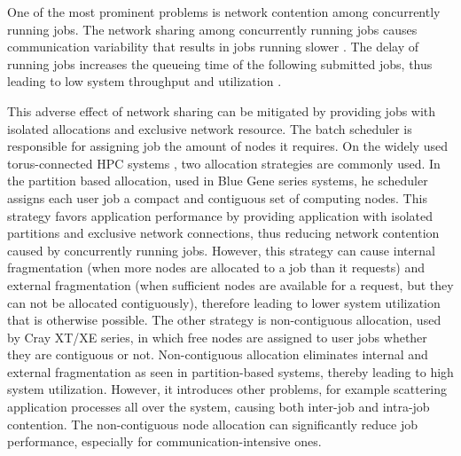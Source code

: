 \documentclass[conference]{IEEEtran}
\begin{document}

One of the most prominent  problems is network contention among concurrently running jobs. The network sharing among concurrently running jobs causes communication variability that results in jobs running slower \cite{abhinav-sc13}. The delay of running jobs increases the queueing time of the following submitted jobs, thus leading to low system throughput and utilization \cite{jose-ipdps15}. 

This adverse effect of network sharing can be mitigated by providing jobs with isolated allocations and exclusive network resource. The batch scheduler is responsible for assigning job the amount of nodes it requires. On the widely used torus-connected HPC systems \cite{bgq}\cite{tofu}\cite{titan}, two allocation strategies are commonly used. In the partition based allocation, used in Blue Gene series systems, he scheduler assigns each user job a compact and contiguous set of computing nodes. This strategy favors application performance by providing application with isolated partitions and exclusive network connections, thus reducing network contention caused by concurrently running jobs. However, this strategy can cause internal fragmentation (when more nodes are allocated to a job than it requests) and external fragmentation (when sufficient nodes are available for a request, but they can not be allocated contiguously), therefore leading to lower system utilization that is otherwise possible. The other strategy is non-contiguous allocation, used by Cray XT/XE series, in which free nodes are assigned to user jobs whether they are contiguous or not. Non-contiguous allocation eliminates internal and external fragmentation as seen in partition-based systems, thereby leading to high system utilization. However, it introduces other problems, for example scattering application processes all over the system, causing both inter-job and intra-job contention. The non-contiguous node allocation can significantly reduce job performance, especially for communication-intensive ones.
\end{document}
